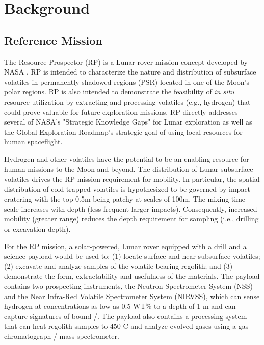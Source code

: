 \documentclass[twocolumn,letterpaper]{IEEEAerospaceCLS}  %
\begin{document}
\section{Background}
\label{sec:background}

\subsection{Reference Mission}
The Resource Prospector (RP) is a Lunar rover mission concept developed by NASA \cite{andrews2015resource,colaprete2015resource}.  RP is intended to characterize the nature and distribution of subsurface volatiles in permanently shadowed regions (PSR) located in one of the Moon's polar regions.  RP is also intended to demonstrate the feasibility of \emph{in situ} resource utilization by extracting and processing volatiles (e.g., hydrogen) that could prove valuable for future exploration missions.  RP directly addresses several of NASA's "Strategic Knowledge Gaps" for Lunar exploration as well as the Global Exploration Roadmap's strategic goal of using local resources for human spaceflight.

Hydrogen and other volatiles have the potential to be an enabling resource for human missions to the Moon and beyond.  
The distribution of Lunar subsurface volatiles drives the RP mission requirement for mobility.  
In particular, the spatial distribution of cold-trapped volatiles is hypothesized to be governed by impact cratering with the top 0.5m being patchy at scales of 100m.  
The mixing time scale increases with depth (less frequent larger impacts).  
Consequently, increased mobility (greater range) reduces the depth requirement for sampling (i.e., drilling or excavation depth).  

For the RP mission, a solar-powered, Lunar rover equipped with a drill and a science payload would be used to: (1) locate surface and near-subsurface volatiles; (2) excavate and analyze samples of the volatile-bearing regolith; and (3) demonstrate the form, extractability and usefulness of the materials.  The payload contains two prospecting instruments, the Neutron Spectrometer System (NSS) and the Near Infra-Red Volatile Spectrometer System (NIRVSS), which can sense hydrogen at concentrations as low as 0.5 WT\% to a depth of 1 m and can capture signatures of bound /.  The payload also contains a processing system that can heat regolith samples to 450 C and analyze evolved gases using a gas chromatograph / mass spectrometer.
\end{document}
